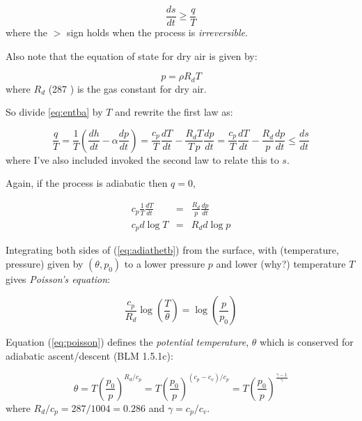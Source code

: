 \documentclass[12pt]{article}
\begin{document}
\begin{equation}
  \label{eq:second}
  \frac{ds}{dt} \geq \frac{q}{T}
\end{equation}
where the $>$ sign holds when the process is \textit{irreversible}.

Also note that the equation of state for dry air is given by:

\begin{equation}
  \label{eq:eos}
  p = \rho R_d T
\end{equation}
where $R_d$ (287 \jkgk) is the gas constant for dry air.

So divide \eqref{eq:entba} by $T$ and  rewrite the first law  as:

\begin{equation}
  \label{eq:poten1}
  \frac{q}{T}  = \frac{1}{T} \left ( \frac{dh}{dt} - \alpha \frac{dp}{dt} \right ) =  
    \frac{c_p}{T} \frac{dT}{dt} - \frac{R_d T}{T\, p} \frac{dp}{dt} = 
    \frac{c_p}{T} \frac{dT}{dt} - \frac{R_d }{ p} \frac{dp}{dt} \leq \frac{ds}{dt}
\end{equation}
where I've also included invoked the second law to relate this to $s$.

Again, if the process is  adiabatic then $q=0$, 

\begin{subequations}
\begin{eqnarray}
  \label{eq:adiathet}
  c_p \frac{1}{T} \frac{dT}{dt} &=& \frac{R_d}{p} \frac{dp}{dt}\\
  c_p  d\log{T} &=& R_d d \log {p}\label{eq:adiathetb}
\end{eqnarray}
\end{subequations}

 Integrating both sides of (\ref{eq:adiathetb}) from the
surface, with (temperature, pressure) given by $(\theta, p_0)$
to a lower pressure $p$ and lower (why?) temperature $T$
gives  \textit{Poisson's equation}:

\begin{equation}
  \label{eq:poisson}
  \frac{c_p}{R_d} \log \left ( \frac{T}{\theta} \right ) = \log \left ( \frac{p}{p_0} \right )
\end{equation}

Equation (\ref{eq:poisson}) defines the \textit{potential temperature}, $\theta$
which is conserved for adiabatic ascent/descent  (BLM 1.5.1c):

\begin{equation}
  \label{eq:pottemp}
  \theta =  T \left ( \frac{p_0}{p} \right )^{R_d/c_p} =
 T \left ( \frac{p_0}{p} \right )^{(c_p - c_v)/c_p} =  
 T \left ( \frac{p_0}{p} \right )^{\frac{\gamma - 1}{\gamma}} 
\end{equation}
where $R_d/c_p = 287/1004 =0.286$ and $\gamma = c_p/c_v$.  
\end{document}
